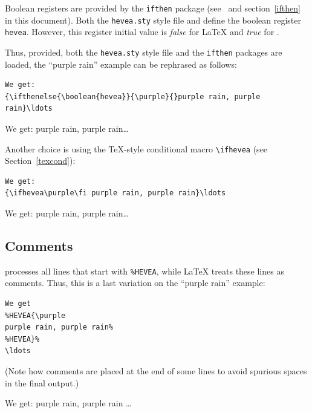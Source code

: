 Boolean registers are provided by the \texttt{ifthen} package
(see~\cite[Section~C.8.5]{latex} and section~\ref{ifthen} in this
document).
Both the \texttt{hevea.sty} style file
and \hevea{} define the boolean register \texttt{hevea}.
However, this register initial value is \textit{false} for \LaTeX{}
and \textit{true} for \hevea{}.



Thus, provided, both the \texttt{hevea.sty} style file and the
\texttt{ifthen} packages are loaded, the ``purple rain'' example can
be rephrased as follows:
\begin{verbatim}
We get:
{\ifthenelse{\boolean{hevea}}{\purple}{}purple rain, purple rain}\ldots
\end{verbatim}
We get:
{purple rain, purple rain}\ldots

\medskip


Another choice is using the \TeX{}-style conditional macro
\verb+\ifhevea+ (see Section~\ref{texcond}):
\begin{verbatim}
We get:
{\ifhevea\purple\fi purple rain, purple rain}\ldots
\end{verbatim}
We get: {\ifhevea\purple\fi purple rain, purple rain}\ldots

\subsection{Comments}\label{comments}
\hevea{} processes all lines that start with \verb+%HEVEA+, while
\LaTeX{} treats these lines as comments.
Thus, this is a last variation on  the ``purple rain'' example:
\begin{verbatim}
We get
%HEVEA{\purple
purple rain, purple rain%
%HEVEA}%
\ldots
\end{verbatim}
(Note how comments are placed at the end of some lines to avoid spurious spaces
in the final output.)

We get:
purple rain, purple rain%
\ldots

